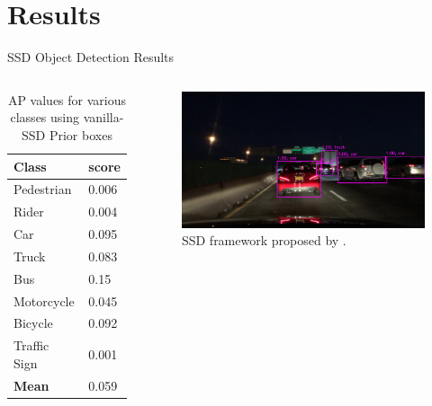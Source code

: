 \documentclass[10pt, aspectratio=169]{beamer}
\begin{document}
\section{Results}
\begin{frame}[allowframebreaks]{SSD Object Detection Results}

    \begin{columns}
            \begin{table}
                \caption{AP values for various classes using vanilla-SSD Prior boxes}
                \begin{tabular}{ll}
                    \hline
                        \textbf{Class} & \textbf{score} \\ \hline
                        Pedestrian     & 0.006              \\ \hline
                        Rider          & 0.004              \\ \hline
                        Car            & 0.095              \\ \hline
                        Truck          & 0.083              \\ \hline
                        Bus            & 0.15               \\ \hline 
                        Motorcycle     & 0.045              \\ \hline
                        Bicycle        & 0.092              \\ \hline
                        Traffic Sign   & 0.001              \\ \hline
                        \textbf{Mean}  & 0.059  \\\hline
                \end{tabular}
            \end{table}
            \begin{figure}[!ht]
                \centering
                \includegraphics[scale=0.175]{images/9.png}
                \caption[SSD framework]{SSD framework proposed by \citet[p. 24]{Liu2016SSDSS}.}
            \end{figure}
    \end{columns}


\end{frame}
\end{document}

